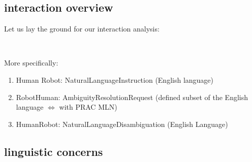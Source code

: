 \documentclass[10pt,a4paper]{article}
\begin{document}
\subsection{interaction overview}
Let us lay the ground for our interaction analysis:
\begin{center} %
\\

\vspace{1 mm}
\end{center}

More specifically:
\begin{enumerate}
 \item Human \textrightarrow Robot: NaturalLanguageInstruction (English language) 
 \item Robot\textrightarrow Human: AmbiguityResolutionRequest (defined subset of the English language $\Leftrightarrow$ with
PRAC MLN)
 \item Human\textrightarrow Robot: NaturalLanguageDisambiguation (English Language)
\end{enumerate}

\subsection{linguistic concerns}
\end{document}
